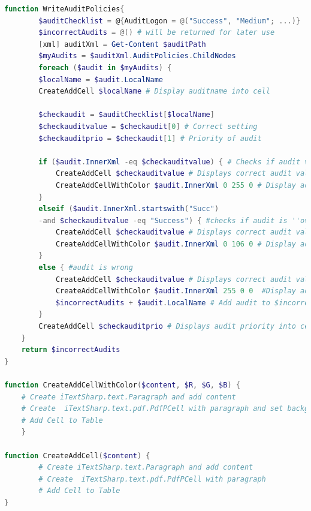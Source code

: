 \begin{lstlisting}[caption=Functions WriteAuditPolicies \& CreateAddCellWithColor \& CreateAddCell, language=PowerShell]
    function WriteAuditPolicies{
        $auditChecklist = @{AuditLogon = @("Success", "Medium"; ...)}
        $incorrectAudits = @() # will be returned for later use
        [xml] auditXml = Get-Content $auditPath
        $myAudits = $auditXml.AuditPolicies.ChildNodes
        foreach ($audit in $myAudits) {
        $localName = $audit.LocalName
        CreateAddCell $localName # Display auditname into cell

        $checkaudit = $auditChecklist[$localName]
        $checkauditvalue = $checkaudit[0] # Correct setting
        $checkauditprio = $checkaudit[1] # Priority of audit

        if ($audit.InnerXml -eq $checkauditvalue) { # Checks if audit values are equal
            CreateAddCell $checkauditvalue # Displays correct audit value
            CreateAddCellWithColor $audit.InnerXml 0 255 0 # Display actual audit value into cell, color green  
        }
        elseif ($audit.InnerXml.startswith("Succ") 
        -and $checkauditvalue -eq "Success") { #checks if audit is ''overpowered''
            CreateAddCell $checkauditvalue # Displays correct audit value
            CreateAddCellWithColor $audit.InnerXml 0 106 0 # Display actual audit value into cell, color darkgreen
        }
        else { #audit is wrong
            CreateAddCell $checkauditvalue # Displays correct audit value
            CreateAddCellWithColor $audit.InnerXml 255 0 0  #Display actual audit value into cell, color red
            $incorrectAudits + $audit.LocalName # Add audit to $incorrectAudits
        }
        CreateAddCell $checkauditprio # Displays audit priority into cell
    }
    return $incorrectAudits
}

function CreateAddCellWithColor($content, $R, $G, $B) {
    # Create iTextSharp.text.Paragraph and add content
    # Create  iTextSharp.text.pdf.PdfPCell with paragraph and set backgroundcolor $R $G $B
    # Add Cell to Table
    }

function CreateAddCell($content) {
        # Create iTextSharp.text.Paragraph and add content
        # Create  iTextSharp.text.pdf.PdfPCell with paragraph
        # Add Cell to Table
}
\end{lstlisting}